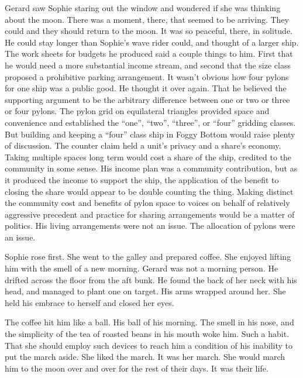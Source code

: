 Gerard saw Sophie staring out the window and wondered if she was
thinking about the moon.  There was a moment, there, that seemed to be
arriving.  They could and they should return to the moon.  It was so
peaceful, there, in solitude.  He could stay longer than Sophie's wave
rider could, and thought of a larger ship.  The work sheets for
budgets he produced said a couple things to him.  First that he would
need a more substantial income stream, and second that the size class
proposed a prohibitive parking arrangement.  It wasn't obvious how
four pylons for one ship was a public good.  He thought it over again.
That he believed the supporting argument to be the arbitrary
difference between one or two or three or four pylons.  The pylon grid
on equilateral triangles provided space and convenience and
established the ``one'', ``two'', ``three'', or ``four'' gridding
classes.  But building and keeping a ``four'' class ship in Foggy
Bottom would raise plenty of discussion.  The counter claim held a
unit's privacy and a share's economy.  Taking multiple spaces long
term would cost a share of the ship, credited to the community in some
sense.  His income plan was a community contribution, but as it
produced the income to support the ship, the application of the
benefit to closing the share would appear to be double counting the
thing.  Making distinct the community cost and benefits of pylon space
to voices on behalf of relatively aggressive precedent and practice
for sharing arrangements would be a matter of politics.  His living
arrangements were not an issue.  The allocation of pylons were an
issue.



Sophie rose first.  She went to the galley and prepared coffee.  She
enjoyed lifting him with the smell of a new morning.  Gerard was not
a morning person.  He drifted across the floor from the aft bunk.  He
found the back of her neck with his head, and managed to plant one on
target.  His arms wrapped around her.  She held his embrace to herself
and closed her eyes.





The coffee hit him like a ball.  His ball of his morning.  The smell
in his nose, and the simplicity of the tea of roasted beans in his
mouth woke him.  Such a habit.  That she should employ such devices to
reach him a condition of his inability to put the march aside.  She
liked the march.  It was her march.  She would march him to the moon
over and over for the rest of their days.  It was their life.

